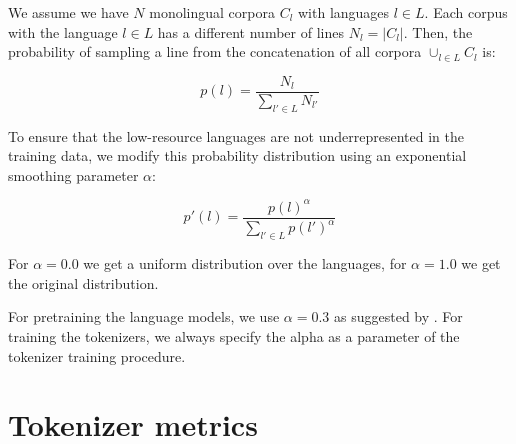 We assume we have $N$ monolingual corpora $C_l$ with languages $l \in L$. Each corpus with the language $l \in L$ has a different number of lines $N_l = |C_l|$. Then, the probability of sampling a line from the concatenation of all corpora $\cup_{l \in L} C_l$ is:

\begin{equation}
    p(l) = \frac{N_l}{\sum_{l' \in L} N_{l'}}
\end{equation}


To ensure that the low-resource languages are not underrepresented in the training data, we modify this probability distribution using an exponential smoothing parameter $\alpha$:

\begin{equation}
    p'(l) = \frac{p(l)^\alpha}{\sum_{l' \in L} p(l')^\alpha}
\end{equation}

For $\alpha = 0.0$ we get a uniform distribution over the languages, for $\alpha = 1.0$ we get the original distribution. 

For pretraining the language models, we use $\alpha = 0.3$ as suggested by \citet{conneau_unsupervised_2020-1}. For training the tokenizers, we always specify the alpha as a parameter of the tokenizer training procedure. 

\section{Tokenizer metrics}
\label{sec:tokenizer_metrics}




